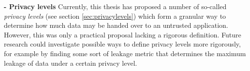 \begin{futurework}\label{fw:privacy-levels}
\textbf{- Privacy levels} Currently, this thesis has proposed a number of so-called \textit{privacy levels} (see section \ref{sec:privacylevels}) which form a granular way to determine how much data may be handed over to an untrusted application. However, this was only a practical proposal lacking a rigorous definition. Future research could investigate possible ways to define privacy levels more rigorously, for example by finding some sort of leakage metric that determines the maximum leakage of data under a certain privacy level.
\end{futurework}




